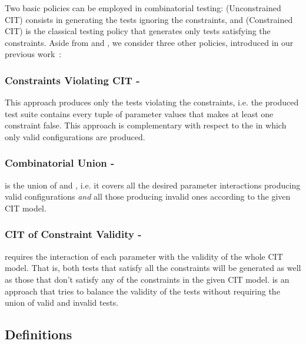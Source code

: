 \begin{tikzborder}{\cite{Gargantini16:validation}}
\begin{tikzborder}{\cite{gargantini_combinatorial_2017}}
Two basic policies can be employed in combinatorial testing: \ic (Unconstrained CIT) consists in generating the tests ignoring the constraints, and \ccit (Constrained CIT) is the classical testing policy that generates only tests satisfying the constraints. Aside from \ic and \ccit, we consider three other policies, introduced in our previous work~\cite{Gargantini16:validation}:

\subsubsection{Constraints Violating CIT - \cv}
This approach produces only the tests violating the constraints, i.e. the produced test suite contains every tuple of parameter values that makes at least one constraint false. This approach is complementary with respect to the \ccit in which only valid configurations are produced.

\subsubsection{Combinatorial Union - \cucv}
\cucv is the union of \ccit and \cv, i.e. it covers all the desired parameter interactions producing valid configurations \emph{and} all those producing invalid ones according to the given CIT model.

\subsubsection{CIT of Constraint Validity - \ValC}
\ValC requires the interaction of each parameter with the validity of the whole CIT model. That is, both tests that satisfy all the constraints will be generated as well as those that don't satisfy any of the constraints in the given CIT model. \ValC is an approach that tries to balance the validity of the tests without requiring the union of valid and invalid tests.

\be

\subsection{Definitions}
\label{sec:defs}


\end{tikzborder}
\end{tikzborder}
